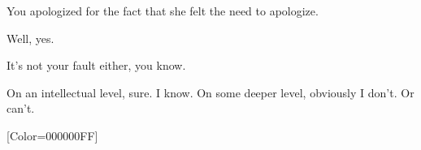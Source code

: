 \begin{paracol}{2}
\begin{leftcolumn}
\begin{ally}
You apologized for the fact that she felt the need to apologize.
\end{ally}
Well, yes.

\begin{ally}
It's not your fault either, you know.
\end{ally}
On an intellectual level, sure. I know. On some deeper level, obviously I don't. Or can't.
\newpage
\end{leftcolumn}
\end{paracol}
\resetbackgroundcolor

\renewfontfamily{}[Color=000000FF]
